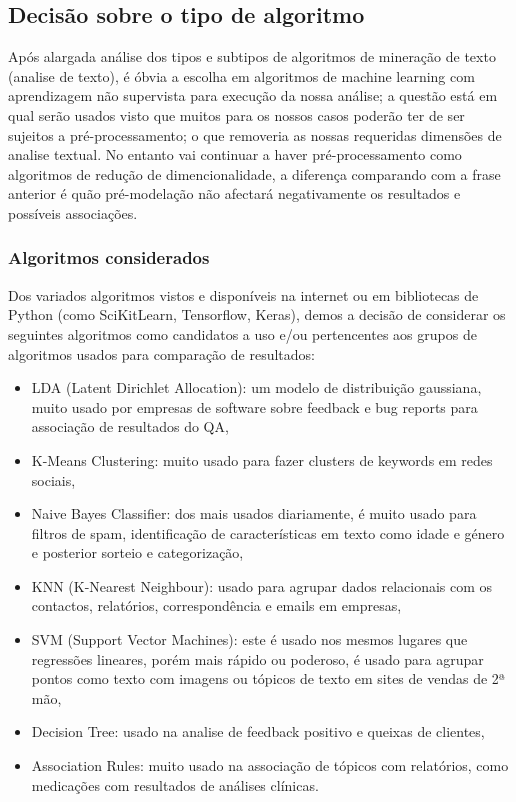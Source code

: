 \documentclass[a4paper,10pt]{article}
\begin{document}
\subsection{Decisão sobre o tipo de algoritmo}

Após alargada análise dos tipos e subtipos de algoritmos de mineração de texto (analise de texto), é óbvia a escolha em algoritmos de machine learning com aprendizagem não supervista para execução da nossa análise; a questão está em qual serão usados visto que muitos para os nossos casos poderão ter de ser sujeitos a pré-processamento; o que removeria as nossas requeridas dimensões de analise textual.
No entanto vai continuar a haver pré-processamento como algoritmos de redução de dimencionalidade, a diferença comparando com a frase anterior é quão pré-modelação não afectará negativamente os resultados e possíveis associações.

\subsubsection{Algoritmos considerados}

Dos variados algoritmos vistos e disponíveis na internet ou em bibliotecas de Python (como SciKitLearn, Tensorflow, Keras), demos a decisão de considerar os seguintes algoritmos como candidatos a uso e/ou pertencentes aos grupos de algoritmos usados para comparação de resultados:
\begin{itemize}
    \item LDA (Latent Dirichlet Allocation): um modelo de distribuição gaussiana, muito usado por empresas de software sobre feedback e bug reports para associação de resultados do QA,
    \item K-Means Clustering: muito usado para fazer clusters de keywords em redes sociais,
    \item Naive Bayes Classifier: dos mais usados diariamente, é muito usado para filtros de spam, identificação de características em texto como idade e género e posterior sorteio e categorização,
    \item KNN (K-Nearest Neighbour): usado para agrupar dados relacionais com os contactos, relatórios, correspondência e emails em empresas,
    \item SVM (Support Vector Machines): este é usado nos mesmos lugares que regressões lineares, porém mais rápido ou poderoso, é usado para agrupar pontos como texto com imagens ou tópicos de texto em sites de vendas de 2ª mão,
    \item Decision Tree: usado na analise de feedback positivo e queixas de clientes,
    \item Association Rules: muito usado na associação de tópicos com relatórios, como medicações com resultados de análises clínicas.
\end{itemize}
\end{document}
